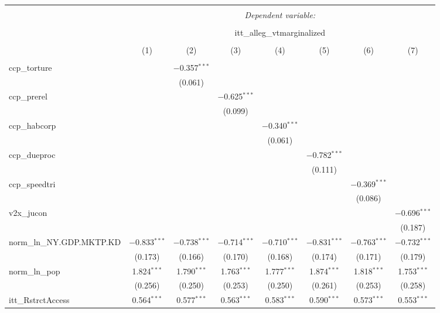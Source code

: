 
\begin{sidewaystable}[!htbp] \centering 
  \caption{} 
  \label{} 
\tiny 
\begin{tabular}{@{\extracolsep{5pt}}lccccccc} 
\\[-1.8ex]\hline 
\hline \\[-1.8ex] 
 & \multicolumn{7}{c}{\textit{Dependent variable:}} \\ 
\cline{2-8} 
\\[-1.8ex] & \multicolumn{7}{c}{itt\_alleg\_vtmarginalized} \\ 
\\[-1.8ex] & (1) & (2) & (3) & (4) & (5) & (6) & (7)\\ 
\hline \\[-1.8ex] 
 ccp\_torture &  & $-$0.357$^{***}$ &  &  &  &  &  \\ 
  &  & (0.061) &  &  &  &  &  \\ 
  ccp\_prerel &  &  & $-$0.625$^{***}$ &  &  &  &  \\ 
  &  &  & (0.099) &  &  &  &  \\ 
  ccp\_habcorp &  &  &  & $-$0.340$^{***}$ &  &  &  \\ 
  &  &  &  & (0.061) &  &  &  \\ 
  ccp\_dueproc &  &  &  &  & $-$0.782$^{***}$ &  &  \\ 
  &  &  &  &  & (0.111) &  &  \\ 
  ccp\_speedtri &  &  &  &  &  & $-$0.369$^{***}$ &  \\ 
  &  &  &  &  &  & (0.086) &  \\ 
  v2x\_jucon &  &  &  &  &  &  & $-$0.696$^{***}$ \\ 
  &  &  &  &  &  &  & (0.187) \\ 
  norm\_ln\_NY.GDP.MKTP.KD & $-$0.833$^{***}$ & $-$0.738$^{***}$ & $-$0.714$^{***}$ & $-$0.710$^{***}$ & $-$0.831$^{***}$ & $-$0.763$^{***}$ & $-$0.732$^{***}$ \\ 
  & (0.173) & (0.166) & (0.170) & (0.168) & (0.174) & (0.171) & (0.179) \\ 
  norm\_ln\_pop & 1.824$^{***}$ & 1.790$^{***}$ & 1.763$^{***}$ & 1.777$^{***}$ & 1.874$^{***}$ & 1.818$^{***}$ & 1.753$^{***}$ \\ 
  & (0.256) & (0.250) & (0.253) & (0.250) & (0.261) & (0.253) & (0.258) \\ 
  itt\_RstrctAccess & 0.564$^{***}$ & 0.577$^{***}$ & 0.563$^{***}$ & 0.583$^{***}$ & 0.590$^{***}$ & 0.573$^{***}$ & 0.553$^{***}$ \\ 

\end{tabular}
\end{sidewaystable}
